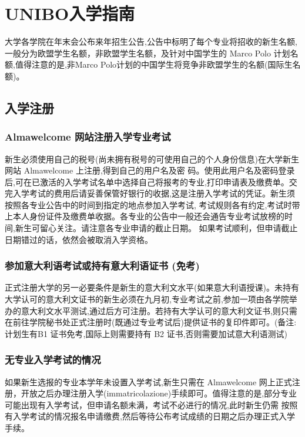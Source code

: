 \chapter{UNIBO入学指南}              

大学各学院在年末会公布来年招生公告,公告中标明了每个专业将招收的新生名额,一般分为欧盟学生名额，非欧盟学生名额，及针对中国学生的 Marco Polo 计划名额,值得注意的是,非Marco Polo计划的中国学生将竞争非欧盟学生的名额(国际生名额)。 

\section{入学注册}

\subsection{Almawelcome 网站注册入学专业考试}
新生必须使用自己的税号(尚未拥有税号的可使用自己的个人身份信息)在大学新生网站 Almawelcome 上注册,得到自己的用户名及密 码。使用此用户名及密码登录后,可在已激活的入学考试名单中选择自己将报考的专业,打印申请表及缴费单。交完入学考试的费用后请妥善保管好银行的收据,这是注册入学考试的凭证。新生须按照各专业公告中的时间到指定的地点参加入学考试, 考试规则各有约定,考试时带上本人身份证件及缴费单收据。各专业的公告中一般还会通告专业考试放榜的时间,新生可留心关注。请注意各专业申请的截止日期。 如果考试顺利，但申请截止日期错过的话，依然会被取消入学资格。

\subsection{参加意大利语考试或持有意大利语证书 (免考)}
正式注册大学的另一必要条件是新生的意大利文水平(如果意大利语授课)。未持有大学认可的意大利文证书的新生必须在九月初,专业考试之前,参加一项由各学院举办的意大利文水平测试,通过后方可注册。若持有大学认可的意大利文证书,则只需在前往学院秘书处正式注册时(既通过专业考试后)提供证书的复印件即可。(备注:计划生有B1 证书免考,国际上则需要持有 B2 证书,否则需要加试意大利语测试) 




\subsection{无专业入学考试的情况}
如果新生选报的专业本学年未设置入学考试,新生只需在 Almawelcome 网上正式注册，开放之后办理注册入学(immatricolazione)手续即可。值得注意的是,部分专业可能出现有入学考试，但申请名额未满，考试不必进行的情况,此时新生仍需 按照有入学考试的情况报名申请缴费,然后等待公布考试成绩的日期之后办理正式入学手续。 
